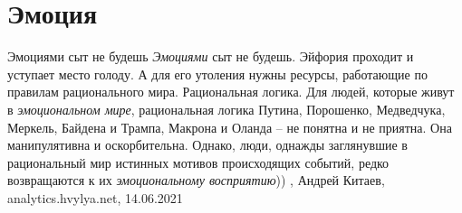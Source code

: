  
 
 
 
 
\chapter{Эмоция}
\label{sec:slova.emocia}

Эмоциями сыт не будешь
\emph{Эмоциями} сыт не будешь. Эйфория проходит и уступает место голоду. А для его
утоления нужны ресурсы, работающие по правилам рационального мира.
Рациональная логика. Для людей, которые живут в \emph{эмоциональном мире},
рациональная логика Путина, Порошенко, Медведчука, Меркель, Байдена и Трампа,
Макрона и Оланда – не понятна и не приятна. Она манипулятивна и оскорбительна.
Однако, люди, однажды заглянувшие в рациональный мир истинных мотивов
происходящих событий, редко возвращаются к их \emph{эмоциональному восприятию}))
, Андрей Китаев, 
analytics.hvylya.net, 14.06.2021

